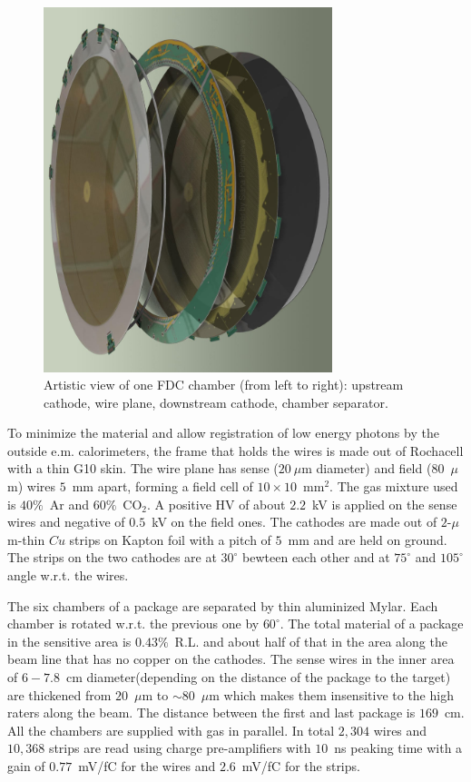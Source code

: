 \begin{figure}[tbp]
\begin{center}
\includegraphics[width=0.75\textwidth]{figures/FDC_OneCell.jpg}  
\caption{\label{FDC_OneCell}
Artistic view of one FDC chamber (from left to right): upstream cathode, wire plane, downstream cathode, chamber separator.
}
\end{center}
\end{figure}
To minimize the material and allow registration of low energy photons by the outside e.m. calorimeters,
the frame that holds the wires is made out of Rochacell with a thin G10 skin.
The wire plane has sense ($20~\mu$m diameter) and field ($80$~$\mu$m) wires $5$~mm apart, forming a field cell of $10\times 10$~mm$^2$. 
The gas mixture used is $40\%$~Ar and $60\%$~CO$_2$.
A positive HV of about $2.2$~kV is applied on the sense wires and negative of $0.5$~kV on the field ones. 
The cathodes are made out of $2$-$\mu$m-thin $Cu$ strips on Kapton foil with a pitch of $5$~mm and are held on ground. The strips on the two cathodes are at $30^\circ $ bewteen each other and at $75^\circ $ and $105^\circ $ angle w.r.t. the wires.

The six chambers of a package are separated by thin aluminized Mylar.
Each chamber is rotated w.r.t. the previous one by $60^\circ $.
The total material of a package in the sensitive area is $0.43\%$~R.L. and about half of that in the area along the beam line that has no copper on the cathodes.
The sense wires in the inner area of $6-7.8$~cm diameter(depending on the distance of the package to the target) are thickened from $20$~$\mu$m to $\sim 80$~$\mu$m which makes them insensitive to the high raters along the beam.
The distance between the first and last package is $169$~cm. 
All the chambers are supplied with gas in parallel. 
In total $2,304$ wires and $10,368$ strips are read using charge pre-amplifiers with $10$~ns peaking time with a gain of $0.77$~mV/fC for the wires and $2.6$~mV/fC for the strips.

